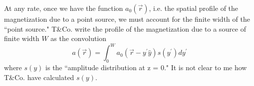 \documentclass{article}
\begin{document}
At any rate, once we have the function $a_{0} (\vec{r})$, i.e. the spatial profile of the magnetization due to a point source, we must account for the finite width of the ``point source." T\&{}Co. write the profile of the magnetization due to a source of finite width $W$ as the convolution
\begin{equation}
a ( \vec{r} ) = \int_{0}^{W} a_{0}(\vec{r} - y^{\prime} \hat{y})s(y^{\prime})d y^{\prime}
\end{equation}  
where $s(y)$ is the ``amplitude distribution at z = 0." It is not clear to me how T\&{}Co. have calculated $s(y)$.
\end{document}
